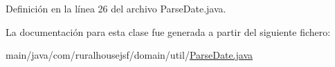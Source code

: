 Definición en la línea 26 del archivo Parse\+Date.\+java.



La documentación para esta clase fue generada a partir del siguiente fichero\+:\begin{DoxyCompactItemize}
\item 
main/java/com/ruralhousejsf/domain/util/\mbox{\hyperlink{_parse_date_8java}{Parse\+Date.\+java}}\end{DoxyCompactItemize}
